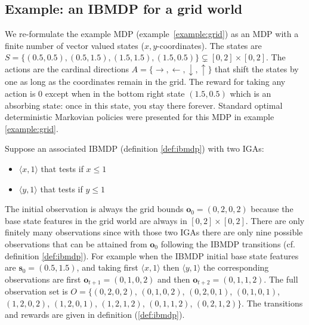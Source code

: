 \subsection{Example: an IBMDP for a grid world}
We re-formulate the example MDP (example~\ref{example:grid}) as an MDP with a finite number of vector valued states ($x,y$-coordinates).
The states are $S = \{(0.5, 0.5), (0.5, 1.5), (1.5, 1.5), (1.5, 0.5)\}\subsetneq [0, 2] \times [0, 2]$.
The actions are the cardinal directions $A = \{\rightarrow, \leftarrow, \downarrow, \uparrow\}$ that shift the states by one as long as the coordinates remain in the grid.
The reward for taking any action is 0 except when in the bottom right state $(1.5, 0.5)$ which is an absorbing state: once in this state, you stay there forever. 
Standard optimal deterministic Markovian policies were presented for this MDP in example \ref{example:grid}.

Suppose an associated IBMDP (definition \ref{def:ibmdp}) with two IGAs:
\begin{itemize}
    \item $\langle x, 1\rangle$ that tests if $x\leq 1$
    \item $\langle y, 1\rangle$ that tests if $y\leq 1$
\end{itemize}
The initial observation is always the grid bounds $\boldsymbol{o}_0=(0, 2, 0, 2)$ because the base state features in the grid world are always in $[0, 2] \times [0, 2]$.
There are only finitely many observations since with those two IGAs there are only nine possible observations that can be attained from $\boldsymbol{o}_0$ following the IBMDP transitions (cf. definition \ref{def:ibmdp}).
For example when the IBMDP initial base state features are $\boldsymbol{s}_0 = (0.5, 1.5)$, and taking first $\langle x, 1\rangle$ then $\langle y, 1\rangle$ the corresponding observations are first $\boldsymbol{o}_{t+1} = (0, 1, 0, 2)$ and then $\boldsymbol{o}_{t+2} = (0, 1, 1, 2)$.
The full observation set is $O = \{(0, 2, 0, 2)$, $(0, 1, 0, 2)$, $(0, 2, 0, 1)$, $(0, 1, 0, 1)$, $(1, 2, 0, 2)$, $(1, 2, 0, 1)$, $(1, 2, 1, 2)$, $(0, 1, 1, 2)$, $(0, 2, 1, 2)\}$.
The transitions and rewards are given in definition (\ref{def:ibmdp}).

